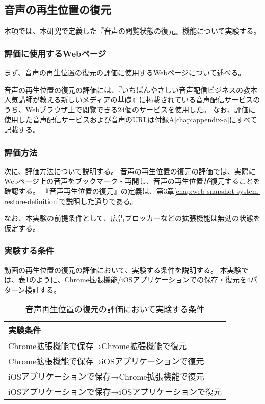 \subsection{音声の再生位置の復元}
本項では、本研究で定義した『音声の閲覧状態の復元』機能について実験する。

\subsubsection{評価に使用するWebページ}
まず、音声の再生位置の復元の評価に使用するWebページについて述べる。

音声の再生位置の復元の評価には、『いちばんやさしい音声配信ビジネスの教本 人気講師が教える新しいメディアの基礎』\cite{}に掲載されている音声配信サービスのうち、Webブラウザ上で閲覧できる24個のサービスを使用した。
なお、評価に使用した音声配信サービスおよび音声のURLは付録A\ref{chap:appendix-a}にすべて記載する。

\subsubsection{評価方法}
次に、評価方法について説明する。
音声の再生位置の復元の評価では、実際にWebページ上の音声をブックマーク・再開し、音声の再生位置が復元することを確認する。
『音声再生位置の復元』の定義は、第3章\ref{chap:web-snapshot-system-restore-definition}で説明した通りである。

なお、本実験の前提条件として、広告ブロッカーなどの拡張機能は無効の状態を仮定する。

\subsubsection{実験する条件}
動画の再生位置の復元の評価において、実験する条件を説明する。
本実験では、表\ref{tb:evl-audio-audio-conditions}のように、Chrome拡張機能/iOSアプリケーションでの保存・復元を4パターン検証する。

\begin{table}[htbp]
  \label{tb:evl-audio-audio-conditions}
  \caption{音声再生位置の復元の評価において実験する条件}
  \begin{center}
    \begin{tabular}{|l|}
    \hline
    実験条件  \\ \hline
    Chrome拡張機能で保存→Chrome拡張機能で復元 \\ \hline
    Chrome拡張機能で保存→iOSアプリケーションで復元 \\ \hline
    iOSアプリケーションで保存→Chrome拡張機能で復元 \\ \hline
    iOSアプリケーションで保存→iOSアプリケーションで復元 \\ \hline
    \end{tabular}
  \end{center}
\end{table}
